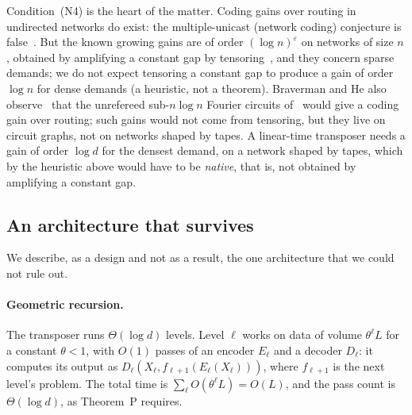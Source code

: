 Condition~(N4) is the heart of the matter. Coding gains over routing in undirected networks do exist: the
multiple-unicast (network coding) conjecture is false~\cite{BravermanHe2026,ZhangLiLi2026}. But the known growing
gains are of order $(\log n)^{\varepsilon}$ on networks of size $n$, obtained by amplifying a constant gap by tensoring~\cite{BGS2017}, and
they concern sparse demands; we do not expect tensoring a constant gap to produce a gain of order $\log n$ for dense
demands (a heuristic, not a theorem). Braverman and He also observe~\cite{BravermanHe2026} that the unrefereed sub-$n\log n$ Fourier circuits
of~\cite{OpenAI2026fourier} would give a coding gain over routing; such gains would not come from tensoring, but they
live on circuit graphs, not on networks shaped by tapes. A linear-time transposer needs a gain of order $\log d$ for the densest demand, on a network shaped by tapes, which by the heuristic above would have to be \emph{native}, that is, not obtained by amplifying a constant gap.

\subsection{An architecture that survives}

We describe, as a design and not as a result, the one architecture that we could not rule out.

\paragraph{Geometric recursion.} The transposer runs $\Theta(\log d)$ levels. Level $\ell$ works on data of
volume $\theta^\ell L$ for a constant $\theta<1$, with $O(1)$ passes of an encoder $E_\ell$ and a decoder
$D_\ell$: it computes its output as $D_\ell(X_\ell,f_{\ell+1}(E_\ell(X_\ell)))$, where $f_{\ell+1}$ is the next
level's problem. The total time is $\sum_\ell O(\theta^\ell L)=O(L)$, and the pass count is $\Theta(\log d)$, as
Theorem~P requires.


